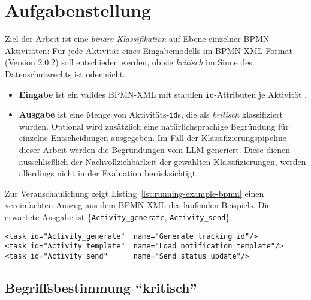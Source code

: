 \section{Aufgabenstellung}\label{sec:aufgabenstellung}

Ziel der Arbeit ist eine \emph{binäre Klassifikation} auf Ebene einzelner \ac{BPMN}-Aktivitäten: Für jede Aktivität eines Eingabemodells im \ac{BPMN}-XML-Format (Version 2.0.2) \cite{omgbpmn} soll entschieden werden, ob sie \emph{kritisch} im Sinne des Datenschutzrechts ist oder nicht.

\begin{itemize}
    \item \textbf{Eingabe} ist ein valides \ac{BPMN}-XML mit stabilen \texttt{id}-Attributen je Aktivität \cite{omgbpmn}.
    \item \textbf{Ausgabe} ist eine Menge von Aktivitäts-\texttt{id}s, die als \emph{kritisch} klassifiziert wurden. Optional wird zusätzlich eine natürlichsprachige Begründung für einzelne Entscheidungen ausgegeben. Im Fall der Klassifizierungspipeline dieser Arbeit werden die Begründungen vom \ac{LLM} generiert. Diese dienen ausschließlich der Nachvollziehbarkeit der gewählten Klassifizierungen, werden allerdings nicht in der Evaluation berücksichtigt.
\end{itemize}

Zur Veranschaulichung zeigt Listing~\ref{lst:running-example-bpmn} einen vereinfachten  Auszug aus dem \ac{BPMN}-XML des laufenden Beispiels. Die erwartete Ausgabe ist \{\texttt{Activity\_generate}, \texttt{Activity\_send}\}.

\begin{lstlisting}[caption={BPMN-XML-Auszug des laufenden Beispiels}, label={lst:running-example-bpmn}]
<task id="Activity_generate"  name="Generate tracking id"/>
<task id="Activity_template"  name="Load notification template"/>
<task id="Activity_send"      name="Send status update"/>
\end{lstlisting}

\subsection*{Begriffsbestimmung \enquote{kritisch}}

